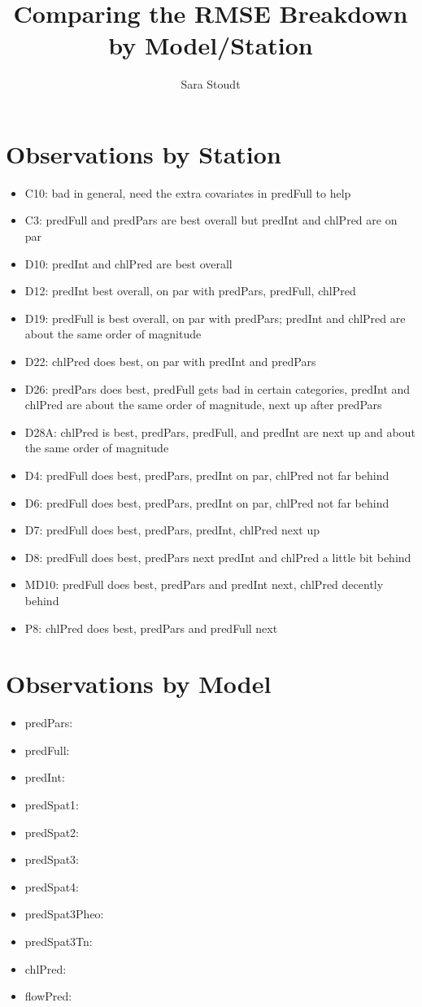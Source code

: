 \documentclass[12pt]{amsart}
\title{Comparing the RMSE Breakdown by Model/Station}
\author{Sara Stoudt}
\date{} %
\begin{document}
\maketitle



\section{Observations by Station}

\begin{itemize}

\item C10: bad in general, need the extra covariates in predFull to help
\item C3: predFull and predPars are best overall but predInt and chlPred are on par
\item D10: predInt and chlPred are best overall
\item D12: predInt best overall, on par with predPars, predFull, chlPred
\item D19: predFull is best overall, on par with predPars; predInt and chlPred are about the same order of magnitude
\item D22: chlPred does best, on par with predInt and predPars
\item D26: predPars does best, predFull gets bad in certain categories, predInt and chlPred are about the same order of magnitude, next up after predPars
\item D28A: chlPred is best, predPars, predFull, and predInt are next up and about the same order of magnitude
\item D4: predFull does best, predPars, predInt on par, chlPred not far behind
\item D6: predFull does best, predPars, predInt on par, chlPred not far behind
\item D7: predFull does best, predPars, predInt, chlPred next up
\item D8: predFull does best, predPars next predInt and chlPred a little bit behind
\item MD10: predFull does best, predPars and predInt next, chlPred decently behind
\item P8: chlPred does best, predPars and predFull next
\end{itemize}




\section{Observations by Model}
\begin{itemize}
\item predPars:
\item predFull:
\item predInt:
\item predSpat1:
\item predSpat2:
\item predSpat3:
\item predSpat4:
\item predSpat3Pheo:
\item predSpat3Tn:
\item chlPred:
\item flowPred:
\end{itemize}
\end{document}
